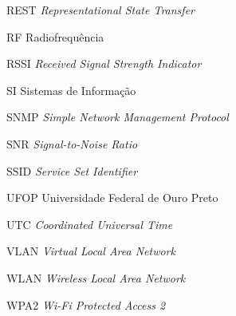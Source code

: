 \begin{siglas}
  \item[REST] \textit{Representational State Transfer}
  \item[RF] Radiofrequência
  \item[RSSI] \textit{Received Signal Strength Indicator}
  \item[SI] Sistemas de Informação
  \item[SNMP] \textit{Simple Network Management Protocol}
  \item[SNR] \textit{Signal-to-Noise Ratio}
  \item[SSID] \textit{Service Set Identifier}
  \item[UFOP] Universidade Federal de Ouro Preto
  \item[UTC] \textit{Coordinated Universal Time}
  \item[VLAN] \textit{Virtual Local Area Network}
  \item[WLAN] \textit{Wireless Local Area Network}
  \item[WPA2] \textit{Wi-Fi Protected Access 2}
\end{siglas}
